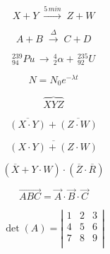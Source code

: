 \documentclass[12pt,a4paper, oneside]{book}
\begin{document}
\begin{equation}
X + Y \; \stackrel{5\,min}{\longrightarrow}\; Z + W
\end{equation}

\begin{equation}
A + B \; \stackrel{\Delta}{\longrightarrow}\; C + D
\end{equation}

\begin{equation}
_{94}^{239}Pu \,\longrightarrow\, _{2}^{4}\alpha + \,_{92}^{235}U
\end{equation}

\begin{equation}
N = N_{0} e^{-\lambda t}
\end{equation}

\begin{equation}
\overbrace{XYZ}
\end{equation}

\begin{equation}
\overline{(X \cdot Y)} + \overline{(Z \cdot W)}
\end{equation}

\begin{equation}
\overline{(X \cdot Y) + (Z \cdot W)}
\end{equation}

\begin{equation}
(\overline{X} + Y \cdot W) \cdot (\overline{Z} \cdot \overline{R})
\end{equation}

\begin{equation}
\overrightarrow{ABC} = \overrightarrow{A} \cdot \overrightarrow{B} \cdot \overrightarrow{C}
\end{equation}

\begin{equation}
\det(A) = \left\vert
\begin{array}{ccc}
	1 & 2 & 3 \\
	4 & 5 & 6 \\
	7 & 8 & 9 \\
\end{array}
\right\vert
\end{equation}
\end{document}
